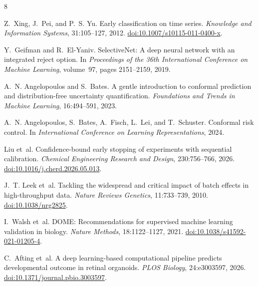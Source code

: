 \documentclass[11pt,twocolumn]{article}
\begin{document}
\begin{thebibliography}{8}

Z.~Xing, J.~Pei, and P.~S. Yu.
\newblock Early classification on time series.
\newblock \emph{Knowledge and Information Systems}, 31:105--127, 2012.
\newblock \href{https://doi.org/10.1007/s10115-011-0400-x}{doi:10.1007/s10115-011-0400-x}.

Y.~Geifman and R.~El-Yaniv.
\newblock SelectiveNet: A deep neural network with an integrated reject option.
\newblock In \emph{Proceedings of the 36th International Conference on Machine Learning},
  volume~97, pages 2151--2159, 2019.

A.~N. Angelopoulos and S.~Bates.
\newblock A gentle introduction to conformal prediction and distribution-free uncertainty
  quantification.
\newblock \emph{Foundations and Trends in Machine Learning}, 16:494--591, 2023.

A.~N. Angelopoulos, S.~Bates, A.~Fisch, L.~Lei, and T.~Schuster.
\newblock Conformal risk control.
\newblock In \emph{International Conference on Learning Representations}, 2024.

Liu et~al.
\newblock Confidence-bound early stopping of experiments with sequential calibration.
\newblock \emph{Chemical Engineering Research and Design}, 230:756--766, 2026.
\newblock \href{https://doi.org/10.1016/j.cherd.2026.05.013}{doi:10.1016/j.cherd.2026.05.013}.

J.~T. Leek et~al.
\newblock Tackling the widespread and critical impact of batch effects in high-throughput data.
\newblock \emph{Nature Reviews Genetics}, 11:733--739, 2010.
\newblock \href{https://doi.org/10.1038/nrg2825}{doi:10.1038/nrg2825}.

I.~Walsh et~al.
\newblock DOME: Recommendations for supervised machine learning validation in biology.
\newblock \emph{Nature Methods}, 18:1122--1127, 2021.
\newblock \href{https://doi.org/10.1038/s41592-021-01205-4}{doi:10.1038/s41592-021-01205-4}.

C.~Afting et~al.
\newblock A deep learning-based computational pipeline predicts developmental outcome in retinal
  organoids.
\newblock \emph{PLOS Biology}, 24:e3003597, 2026.
\newblock \href{https://doi.org/10.1371/journal.pbio.3003597}{doi:10.1371/journal.pbio.3003597}.

\end{thebibliography}
\end{document}
